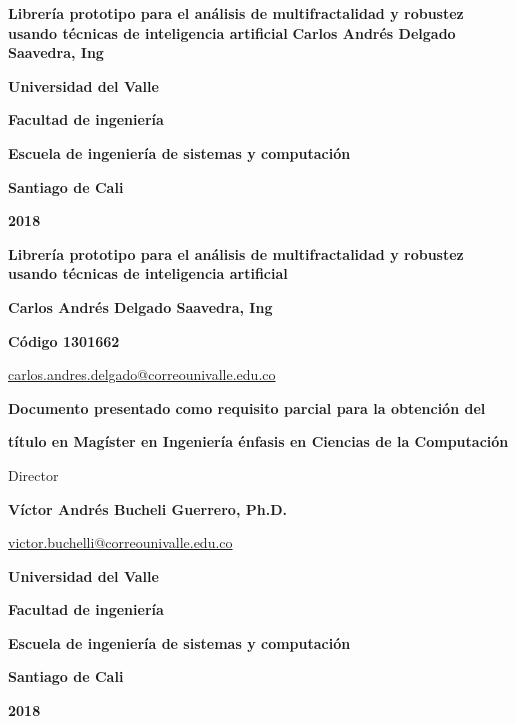 \begin{titlepage}
		\begin{center}
			{\bf Librería prototipo para el análisis de multifractalidad y robustez usando técnicas de inteligencia artificial}
			\vfill
			{\bf Carlos Andrés Delgado Saavedra, Ing}
			\vfill
			{\bf Universidad del Valle  \par}
			{\bf Facultad de ingeniería \par}
			{\bf Escuela de ingeniería de sistemas y computación \par}
			{\bf Santiago de Cali \par}
			{\bf 2018 \par}
		\end{center}
\end{titlepage}


\begin{titlepage}
	\begin{center}
		{\bf Librería prototipo para el análisis de multifractalidad y robustez usando técnicas de inteligencia artificial}
		\vfill
		{\bf Carlos Andrés Delgado Saavedra, Ing \par}
		{\bf Código 1301662 \par}
		{\url{carlos.andres.delgado@correounivalle.edu.co} \par}
		\vfill
		{\bf Documento presentado como requisito parcial para la obtención del \par}
		{\bf título en Magíster en Ingeniería énfasis en Ciencias de la Computación \par}
		\vfill

		{Director \par}
		{\bf Víctor Andrés Bucheli Guerrero, Ph.D. \par}
		{\url{victor.buchelli@correounivalle.edu.co} \par}
		\vfill
		{\bf Universidad del Valle  \par}
		{\bf Facultad de ingeniería \par}
		{\bf Escuela de ingeniería de sistemas y computación \par}
		{\bf Santiago de Cali \par}
		{\bf 2018 \par}
	\end{center}
\end{titlepage}
